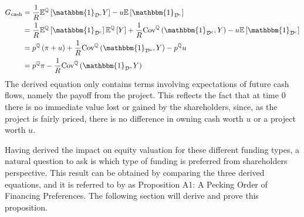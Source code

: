 \documentclass[../main.tex]{subfiles}
\begin{document}
            \begin{align}
                G_{\text{cash}} &=
                    \discountfactor
                    \mathbb{E}^{\mathbb{Q}}\left[
                        \mathbbm{1}_{\mathcal{D}^{c}} Y
                    \right]
                    -
                    u
                    \mathbb{E}\left[\mathbbm{1}_{\mathcal{D}^{c}} \right]
                    \nonumber \\
                &=
                    \discountfactor
                    \mathbb{E}^{\mathbb{Q}}\left[\mathbbm{1}_{\mathcal{D}^{c}}\right] 
                    \mathbb{E}^{\mathbb{Q}}\left[Y\right] 
                    + 
                    \discountfactor
                    \text{Cov}^{\mathbb{Q}}\left(\mathbbm{1}_{\mathcal{D}^{c}}, Y\right) 
                    -
                    u
                    \mathbb{E}\left[\mathbbm{1}_{\mathcal{D}^{c}} \right]
                    \nonumber \\
                &= 
                    p^{\mathbb{Q}}
                    \left(
                        \pi + u
                    \right)
                    +
                    \discountfactor
                    \text{Cov}^{\mathbb{Q}}\left(\mathbbm{1}_{\mathcal{D}^{c}}, Y\right) 
                    -
                    p^{\mathbb{Q}}
                    u
                    \nonumber \\
                &=
                    p^{\mathbb{Q}}
                    \pi
                    -
                    \discountfactor
                    \text{Cov}^{\mathbb{Q}}\left(\mathbbm{1}_{\mathcal{D}}, Y\right) 
                \label{eqn:marginal-shareholder-value-cash-financing}
            \end{align}
        The derived equation only contains terms involving expectations of future cash flows,
        namely the payoff from the project.
        This reflects the fact that at time 0 there is no immediate value lost or gained
        by the shareholders, since, as the project is fairly priced, there is no difference
        in owning cash worth $u$ or a project worth $u$.

        Having derived the impact on equity valuation for these different funding types,
        a natural question to ask is which type of funding is preferred from shareholders perspective.
        This result can be obtained by comparing the three derived equations,
        and it is referred to by \textcite{ADS2016} as Proposition A1: A Pecking Order of Financing Preferences.
        The following section will derive and prove this proposition.
\end{document}
